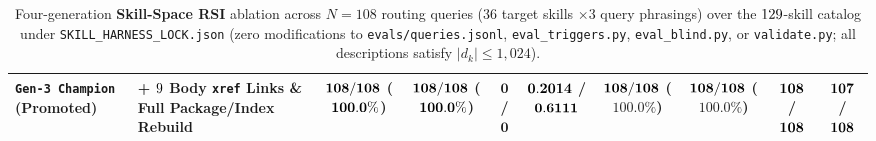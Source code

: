 \begin{table}[t]
{\begin{tabular}{llcccccccc}
\textbf{\texttt{Gen-3 Champion} (Promoted)} & \textbf{+ $9{}$ Body \texttt{xref} Links \& Full Package/Index Rebuild} & $\mathbf{108{}/108}$ ($\mathbf{100.0{}\%}$) & $\mathbf{108{}/108}$ ($\mathbf{100.0{}\%}$) & $\mathbf{0}$ / $\mathbf{0}$ & $\mathbf{0.2014{}}$ / $\mathbf{0.6111{}}$ & $\mathbf{108{}/108}$ ($\mathbf{100.0\%}$) & $\mathbf{108{}/108}$ ($\mathbf{100.0\%}$) & $\mathbf{108{}}$ / $\mathbf{108{}}$ & $\mathbf{107{}}$ / $\mathbf{108{}}$ \\
\bottomrule
\end{tabular}%
}
\caption{Four-generation \textbf{Skill-Space RSI} ablation across $N=108$ routing queries ($36$ target skills $\times 3$ query phrasings) over the $129{}$-skill catalog under \texttt{SKILL\_HARNESS\_LOCK.json} (zero modifications to \texttt{evals/queries.jsonl}, \texttt{eval\_triggers.py}, \texttt{eval\_blind.py}, or \texttt{validate.py}; all descriptions satisfy $|d_k| \le 1{,}024$).}
\label{tab:skill_rsi_ablation}
\end{table}

